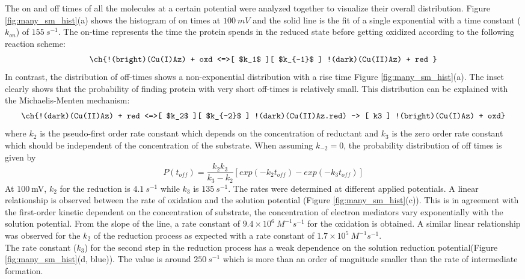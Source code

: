 \documentclass[journal=jacsat,manuscript=article]{achemso}
\begin{document}
The on and off times of all the molecules at a certain potential were analyzed together to visualize their overall 
distribution. Figure \ref{fig:many_sm_hist}(a) shows the histogram of on times at $100~mV$ and the solid line is the 
fit of a single exponential with a time constant ($k_{on}$) of $155~s^{-1}$. The on-time represents the time the 
protein spends in the reduced state before getting oxidized according to the following reaction scheme:
\begin{align}
	\ch{!(bright)(Cu(I)Az) + oxd <=>[ $k_1$ ][ $k_{-1}$ ] !(dark)(Cu(II)Az) + red }
	\label{eq:oxidation}
\end{align}
In contrast, the distribution of off-times shows a non-exponential distribution with a rise time 
Figure \ref{fig:many_sm_hist}(a). The inset clearly shows that the probability of finding protein with very short 
off-times is relatively small. This distribution can be explained with the Michaelis-Menten mechanism:
\begin{align}
	\ch{!(dark)(Cu(II)Az) + red <=>[ $k_2$ ][ $k_{-2}$ ] !(dark)(Cu(II)Az.red) -> [ k3 ] !(bright)(Cu(I)Az) + oxd}
	\label{eq:reduction}
\end{align}
where $k_2$ is the pseudo-first order rate constant which depends on the concentration of reductant and $k_3$ is the 
zero order rate constant which should be independent of the concentration of the substrate. When assuming $k_{-2}=0$, 
the probability distribution of off times is given by\cite{lu1998single-molecule}
\begin{equation}
	P(t_{off}) = \frac{k_2k_3}{k_3-k_2} [exp(-k_2t_{off})-exp(-k_3t_{off})]
	\label{eq:2exp_risetime}
\end{equation}
At $100~$mV, $k_2$ for the reduction is $4.1~s^{-1}$ while $k_3$ is $135~s^{-1}$. The rates were determined at 
different applied potentials. A linear relationship is observed between the rate of oxidation and the solution 
potential (Figure \ref{fig:many_sm_hist}(c)). This is in agreement with the first-order kinetic dependent on the 
concentration of substrate, the concentration of electron mediators vary exponentially with the solution potential. 
From the slope of the line, a rate constant of $9.4\times10^6~M^{-1}s^{-1}$ for the oxidation is obtained. A similar 
linear relationship was observed for the $k_2$ of the reduction process as expected with a rate constant of 
$1.7\times10^5~M^{-1}s^{-1}$.\\

The rate constant ($k_3$) for the second step in the reduction process has a weak dependence on the solution reduction 
potential(Figure \ref{fig:many_sm_hist}(d, blue)). The value is around $250~s^{-1}$ which is more than an order of 
magnitude smaller than the rate of intermediate formation.\\
\end{document}
